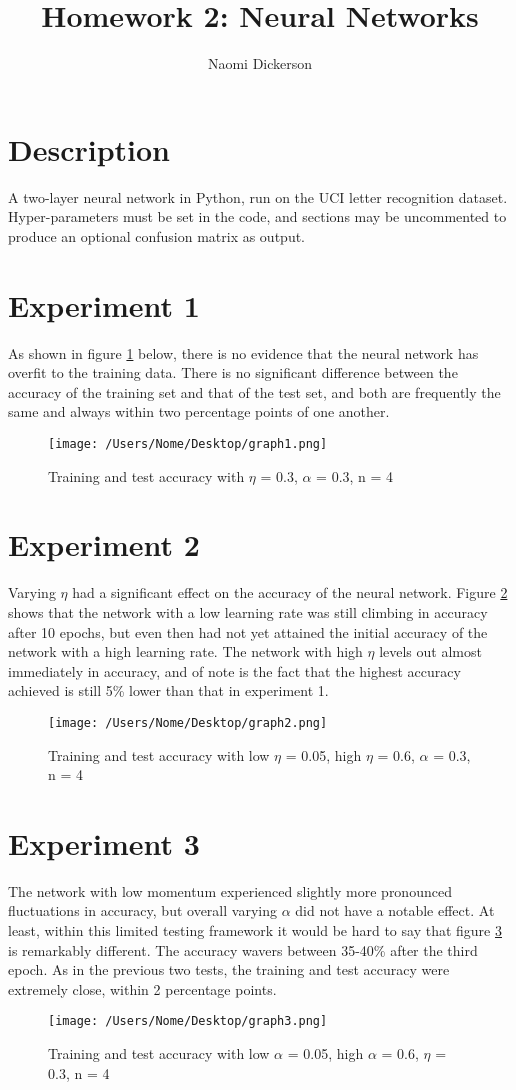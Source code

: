 \documentclass[10pt,letterpaper,notitlepage]{article}
\author{Naomi Dickerson}
\title{Homework 2: Neural Networks}
\begin{document}
	\maketitle
	\section*{Description}
	A two-layer neural network in Python, run on the UCI letter recognition dataset. Hyper-parameters must be set in the code, and sections may be uncommented to produce an optional confusion matrix as output.
	\section*{Experiment 1}
	As shown in figure \ref{exp1} below, there is no evidence that the neural network has overfit to the training data. There is no significant difference between the accuracy of the training set and that of the test set, and both are frequently the same and always within two percentage points of one another.
	\begin{figure}[!htb]
		\texttt{[image: /Users/Nome/Desktop/graph1.png]}
		\caption{Training and test accuracy with $\eta$ = 0.3, $\alpha$ = 0.3, n = 4}
		\label{exp1}
	\end{figure}
	\section*{Experiment 2}
	Varying $\eta$ had a significant effect on the accuracy of the neural network. Figure \ref{exp2} shows that the network with a low learning rate was still climbing in accuracy after 10 epochs, but even then had not yet attained the initial accuracy of the network with a high learning rate. The network with high $\eta$ levels out almost immediately in accuracy, and of note is the fact that the highest accuracy achieved is still 5\% lower than that in experiment 1. 
	\begin{figure}[!htb]
		\texttt{[image: /Users/Nome/Desktop/graph2.png]}
		\caption{Training and test accuracy with low $\eta$ = 0.05, high $\eta$ = 0.6, $\alpha$ = 0.3, n = 4}
		\label{exp2}
	\end{figure}
	\section*{Experiment 3}
	The network with low momentum experienced slightly more pronounced fluctuations in accuracy, but overall varying $\alpha$ did not have a notable effect. At least, within this limited testing framework it would be hard to say that figure \ref{exp3} is remarkably different. The accuracy wavers between 35-40\% after the third epoch. As in the previous two tests, the training and test accuracy were extremely close, within 2 percentage points. 
	\begin{figure}[!htb]
		\texttt{[image: /Users/Nome/Desktop/graph3.png]}
		\caption{Training and test accuracy with low $\alpha$ = 0.05, high $\alpha$ = 0.6, $\eta$ = 0.3, n = 4}
		\label{exp3}
	\end{figure}
\end{document}
